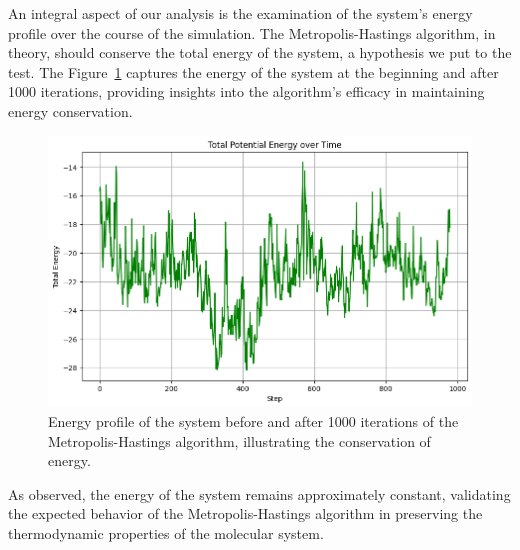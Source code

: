 \documentclass{article}
\begin{document}
An integral aspect of our analysis is the examination of the system's energy profile over the course of the simulation. The Metropolis-Hastings algorithm, in theory, should conserve the total energy of the system, a hypothesis we put to the test. The Figure~\ref{fig:energymh} captures the energy of the system at the beginning and after 1000 iterations, providing insights into the algorithm's efficacy in maintaining energy conservation.

\begin{figure}[H]
	\centering
	\includegraphics[width=0.75\linewidth]{./Figures/MCMC/LennardJones/energy.png}
	\caption{Energy profile of the system before and after 1000 iterations of the Metropolis-Hastings algorithm, illustrating the conservation of energy.}
	\label{fig:energymh}
\end{figure}

As observed, the energy of the system remains approximately constant, validating the expected behavior of the Metropolis-Hastings algorithm in preserving the thermodynamic properties of the molecular system.


\newpage



\end{document}
